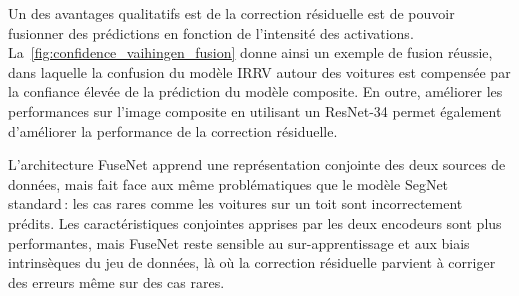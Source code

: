 Un des avantages qualitatifs est de la correction résiduelle est de pouvoir fusionner des prédictions en fonction de l'intensité des activations. La~\cref{fig:confidence_vaihingen_fusion} donne ainsi un exemple de fusion réussie, dans laquelle la confusion du modèle \gls{IRRV} autour des voitures est compensée par la confiance élevée de la prédiction du modèle composite. En outre, améliorer les performances sur l'image composite en utilisant un ResNet-34 permet également d'améliorer la performance de la correction résiduelle.

L'architecture FuseNet apprend une représentation conjointe des deux sources de données, mais fait face aux même problématiques que le modèle SegNet standard\,: les cas rares comme les voitures sur un toit sont incorrectement prédits. Les caractéristiques conjointes apprises par les deux encodeurs sont plus performantes, mais FuseNet reste sensible au sur-apprentissage et aux biais intrinsèques du jeu de données, là où la correction résiduelle parvient à corriger des erreurs même sur des cas rares.

